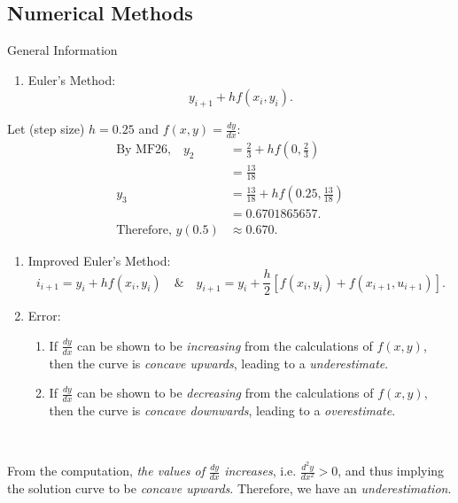 \documentclass[oneside]{book}
\begin{document}
\subsection{Numerical Methods}
\begin{stbox}{General Information}
  \begin{enumerate}
    \item Euler's Method: 
    \[y_{i+1}+hf(x_i,y_i).\]
  \end{enumerate}
\end{stbox}
    \begin{example}{}{}
      Let (step size) \(h=0.25\) and \(f(x,y)=\frac{dy}{dx}\):
      \begin{align*}
        \text{By MF26,}\quad y_2&=\frac{2}{3}+hf\left(0,\frac{2}{3}\right)\\
        &=\frac{13}{18}\\[3mm]
        y_3&=\frac{13}{18}+hf\left(0.25,\frac{13}{18}\right)\\
        &=0.6701865657.\\[3mm]
        \text{Therefore, }y(0.5)&\approx 0.670.
      \end{align*}
    \end{example}
    \begin{stbox}{}
      \setcounter{enumi}{1}
    \begin{enumerate}
    \item Improved Euler's Method: 
    \[i_{i+1}=y_i+hf(x_i,y_i)\quad\&\quad y_{i+1}=y_i+\frac{h}{2}[f(x_i,y_i)+f(x_{i+1},u_{i+1})].\]
    \item Error:
    \begin{enumerate}
      \item If \(\frac{dy}{dx}\) can be shown to be \emph{increasing} from the calculations of \(f(x,y)\), then the curve is \emph{concave upwards}, leading to a \emph{underestimate}.
      \item If \(\frac{dy}{dx}\) can be shown to be \emph{decreasing} from the calculations of \(f(x,y)\), then the curve is \emph{concave downwards}, leading to a \emph{overestimate}.
    \end{enumerate}
  \end{enumerate}
\end{stbox} ~
\begin{example}{}{}
  From the computation, \emph{the values of} \(\frac{dy}{dx}\) \emph{increases}, i.e. \(\frac{d^2y}{dx^2}>0\), and thus implying the solution curve to be \emph{concave upwards}. Therefore, we have an \emph{underestimation}. 
\end{example}
\end{document}
